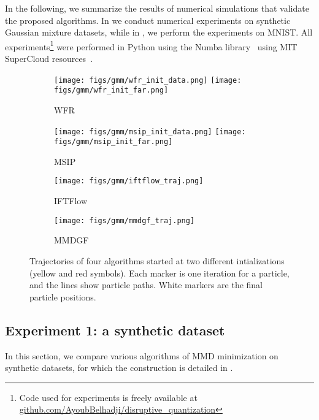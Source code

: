 In the following, we summarize the results of numerical simulations that validate the proposed algorithms.
In  we conduct numerical experiments on synthetic Gaussian mixture datasets, while in , we perform the experiments on MNIST. All experiments\footnote{Code used for experiments is freely available at \href{https://github.com/AyoubBelhadji/disruptive_quantization}{github.com/AyoubBelhadji/disruptive\_quantization}} were performed in Python using the Numba library~\citep{LaPiSe15} using MIT SuperCloud resources~\citep{ReKeBy18}.


\begin{figure}[H]
    \centering
     \begin{subfigure}[t]{0.78\linewidth}
         \centering
         \texttt{[image: figs/gmm/wfr\_init\_data.png]}
        \hfill
        \texttt{[image: figs/gmm/wfr\_init\_far.png]}
         \caption{WFR}
     \end{subfigure}
         
     
     \begin{subfigure}[t]{0.78\linewidth}
         \centering
         \texttt{[image: figs/gmm/msip\_init\_data.png]}
         \hfill
         \texttt{[image: figs/gmm/msip\_init\_far.png]}
         \caption{MSIP}
     \end{subfigure}

     \begin{subfigure}[t]{0.39\linewidth}
         \texttt{[image: figs/gmm/iftflow\_traj.png]}
        \caption{IFTFlow}
     \end{subfigure}
     \begin{subfigure}[t]{0.39\linewidth}
         \texttt{[image: figs/gmm/mmdgf\_traj.png]}
        \caption{MMDGF}
     \end{subfigure}
        \caption{Trajectories of four algorithms started at two different intializations (yellow and red symbols). Each marker is one iteration for a particle, and the lines show  particle paths. White markers are the final particle positions.}
    \label{fig:all_trajectories}
\end{figure}

\clearpage
\subsection{Experiment 1: a synthetic dataset}\label{sec:synthetic_basic_numerics}
In this section, we compare various algorithms of MMD minimization on synthetic datasets, for which the construction is detailed in .

